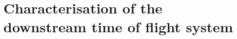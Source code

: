 \chapter{Characterisation of the downstream time of flight system}
\label{ch:hptpc_dtof_characterisation}

\blindtext
